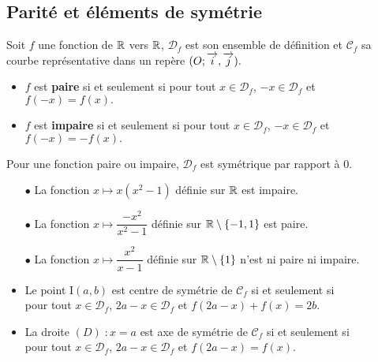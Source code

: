 


  
 \subsection{Parité et éléments de symétrie}
Soit  $ f $    une fonction  de $\mathbb{R} $ vers  $ \mathbb{R}$,  $\mathscr{D}_{f}$ est son ensemble de définition et $\mathscr{C}_{f}$ sa courbe représentative dans   un repère $ (O ;\overrightarrow{i},\overrightarrow{j}). $
\begin{definition}
\begin{itemize}
\item  $ f $   est \textbf{paire} si  et  seulement si pour tout $ x\in \mathscr{D}_{f}$, $ -x\in \mathscr{D}_{f}$ et $ f(-x)=f(x). $
\item $ f $   est \textbf{impaire} si  et  seulement si pour tout $ x\in \mathscr{D}_{f}$, $ -x\in \mathscr{D}_{f}$ et $ f(-x)= -f(x). $
\end{itemize}

\end{definition}
\begin{remark}
Pour une fonction paire ou impaire, $  \mathscr{D}_{f}$  est symétrique par rapport à    $ 0. $
\end{remark}

\begin{example}
\begin{itemize}
\item[$  \bullet$]  La fonction $ x\longmapsto x(x^{2}-1) $  définie sur $ \mathbb{R} $  est   impaire.
\item[$  \bullet$]  La fonction $ x\longmapsto \dfrac{-x^{2}}{x^{2}-1} $  définie sur $ \mathbb{R}\setminus \left\{-1, 1\right\} $  est   paire.

\item[$  \bullet$]  La fonction $ x\longmapsto \dfrac{x^{2}}{x-1} $  définie sur $ \mathbb{R}\setminus \left\{ 1\right\} $   n'est  ni paire ni impaire.
\end{itemize}
\end{example}
\begin{definition}
\begin{itemize}
\item  Le point I$ (a,b) $   est centre de symétrie de $  \mathscr{C}_{f}$ si  et  seulement si\\ pour tout $ x\in \mathscr{D}_{f}$, $ 2a-x\in \mathscr{D}_{f}$ et $ f(2a-x)+f(x)=2b. $
\item La droite $ (D)\;: x=a $  est  axe de symétrie  de               $  \mathscr{C}_{f}$ si  et  seulement si\\ pour tout $ x\in \mathscr{D}_{f}$, $2a -x\in \mathscr{D}_{f}$ et $ f(2a-x)= f(x). $
\end{itemize}

\end{definition}

